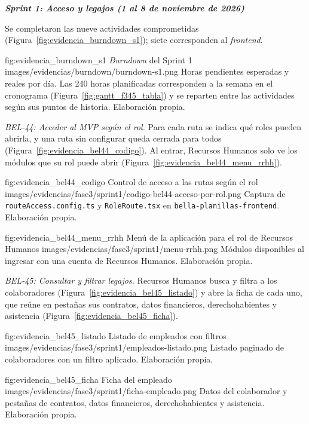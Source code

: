 \par\medskip
\noindent\textbf{\textit{Sprint 1: Acceso y legajos (1 al 8 de noviembre de 2026)}}\par
\nobreak
Se completaron las nueve actividades comprometidas (Figura~\ref{fig:evidencia_burndown_s1}); siete corresponden al \textit{frontend}.

\figuraEvidencia
    {fig:evidencia_burndown_s1}
    {\textit{Burndown} del Sprint 1}
    {images/evidencias/burndown/burndown-s1.png}
    {Horas pendientes esperadas y reales por día. Las 240 horas planificadas corresponden a la semana en el cronograma (Figura~\ref{fig:gantt_f345_tabla}) y se reparten entre las actividades según sus puntos de historia. Elaboración propia.}

\par\smallskip
\noindent\textit{BEL-44: Acceder al MVP según el rol.}
Para cada ruta se indica qué roles pueden abrirla, y una ruta sin configurar queda cerrada para todos (Figura~\ref{fig:evidencia_bel44_codigo}).
Al entrar, Recursos Humanos solo ve los módulos que su rol puede abrir (Figura~\ref{fig:evidencia_bel44_menu_rrhh}).

\figuraEvidenciaCompacta
    {fig:evidencia_bel44_codigo}
    {Control de acceso a las rutas según el rol}
    {images/evidencias/fase3/sprint1/codigo-bel44-acceso-por-rol.png}
    {Captura de \texttt{routeAccess.config.ts} y \texttt{RoleRoute.tsx} en \texttt{bella-planillas-frontend}. Elaboración propia.}

\figuraEvidenciaCompacta
    {fig:evidencia_bel44_menu_rrhh}
    {Menú de la aplicación para el rol de Recursos Humanos}
    {images/evidencias/fase3/sprint1/menu-rrhh.png}
    {Módulos disponibles al ingresar con una cuenta de Recursos Humanos. Elaboración propia.}

\par\smallskip
\noindent\textit{BEL-45: Consultar y filtrar legajos.}
Recursos Humanos busca y filtra a los colaboradores (Figura~\ref{fig:evidencia_bel45_listado})
y abre la ficha de cada uno, que reúne en pestañas sus contratos, datos financieros, derechohabientes y asistencia
(Figura~\ref{fig:evidencia_bel45_ficha}).

\figuraEvidenciaCompacta
    {fig:evidencia_bel45_listado}
    {Listado de empleados con filtros}
    {images/evidencias/fase3/sprint1/empleados-listado.png}
    {Listado paginado de colaboradores con un filtro aplicado. Elaboración propia.}

\figuraEvidenciaCompacta
    {fig:evidencia_bel45_ficha}
    {Ficha del empleado}
    {images/evidencias/fase3/sprint1/ficha-empleado.png}
    {Datos del colaborador y pestañas de contratos, datos financieros, derechohabientes y asistencia. Elaboración propia.}

